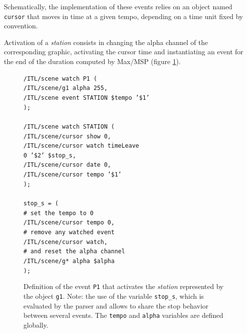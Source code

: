 \documentclass{article}
\newcommand{\OSC}[1]	{{\fontsize{8.5pt}{8pt} \selectfont\texttt{#1}}}
\newcommand{\tab}{\hspace*{4mm}}
\newcommand{\sample}[1]		{\vspace{-0.2em}\begin{center}\colorbox{mygrey}{\begin{minipage}[t]{0.98\columnwidth} {\small \texttt{#1}}\end{minipage}}\end{center}}
\begin{document}
Schematically, the implementation of these events relies on an object named \OSC{cursor} that moves in time at a given tempo, depending on a time unit fixed by convention.

Activation of a \emph{station} consists in changing the alpha channel of the corresponding graphic, activating the cursor time and instantiating an event for the end of the duration computed by Max/MSP (figure \ref{fig:station}).
\begin{figure}[h]
   \centering
\sample{/ITL/scene watch P1 ( \\
\tab/ITL/scene/g1 alpha 255, \\
\tab/ITL/scene event STATION \$tempo '\$1' \\
); \\
\\
/ITL/scene watch STATION ( \\
\tab/ITL/scene/cursor show 0,\\
\tab/ITL/scene/cursor watch timeLeave \\
\hspace*{30mm}0 '\$2' \$stop\_s,\\
\tab/ITL/scene/cursor date 0,\\
\tab/ITL/scene/cursor tempo '\$1'\\
); \\
\\
stop\_s = ( \\
\tab\# set the tempo to 0 \\
\tab/ITL/scene/cursor tempo 0, \\
\tab\# remove any watched event \\
\tab/ITL/scene/cursor watch,  \\
\tab\# and reset the alpha channel \\
\tab/ITL/scene/g* alpha \$alpha \\
);
}
   \caption{Definition of the event \OSC{P1} that activates the \emph{station} represented by the object \OSC{g1}. Note: the use of the variable \OSC{stop\_s}, which is evaluated by the parser and allows to share the stop behavior between several events. The \OSC{tempo} and \OSC{alpha} variables are defined globally.}
   \label{fig:station}
\end{figure}
\end{document}
